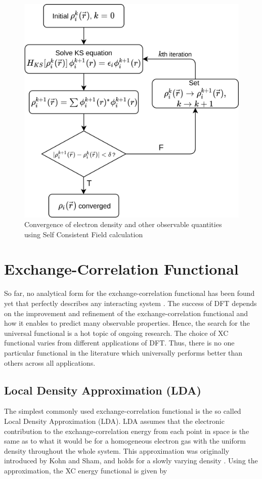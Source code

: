 \begin{figure}[tbh!]
	\centering
	\includegraphics[width=0.7\linewidth]{"images/theory/scf_loop"}
	\caption[Kohn Sham loop]{Convergence of electron density and other observable quantities using Self Consistent Field calculation}
	\label{fig:scf_loop}
\end{figure}
\section{Exchange-Correlation Functional}
So far, no analytical form for the exchange-correlation functional has been found yet that perfectly describes any interacting system \citep{Verma2020,Marques2012,Segala2009}. The success of DFT depends on the improvement and refinement of the exchange-correlation functional and how it enables to predict many observable properties. Hence, the search for the universal functional is a hot topic of ongoing research. The choice of XC functional varies from different applications of DFT. Thus, there is no one particular functional in the literature which universally performs better than others across all applications.

\subsection{Local Density Approximation (LDA)}
The simplest commonly used exchange-correlation functional is the so called Local Density Approximation (LDA).  LDA assumes that the electronic contribution to the exchange-correlation energy from each point in space is the same as to what it would be for a homogeneous electron gas with the uniform density throughout the whole system. This approximation was originally introduced by Kohn and Sham, and holds for a slowly varying density \citep{Kohn1965}. Using the approximation, the XC energy functional is given by

